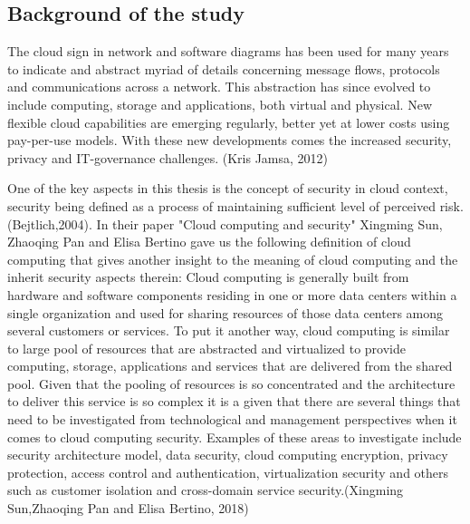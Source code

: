 \documentclass{article}
\begin{document}
\subsection{Background of the study}
The cloud sign in network and software diagrams has been used for many years to indicate and abstract myriad of details concerning message flows, protocols and communications across a network. This abstraction has since evolved to include computing, storage and applications, both virtual and physical. New flexible cloud capabilities are emerging regularly, better yet at lower costs using pay-per-use models. With these new developments comes the increased security, privacy and IT-governance challenges. (Kris Jamsa, 2012)
\par
One of the key aspects in this thesis is the concept of security in cloud context, security being defined as a process of maintaining sufficient level of perceived risk.(Bejtlich,2004).
In their paper "Cloud computing and security" Xingming Sun, Zhaoqing Pan and Elisa Bertino gave us the following definition of cloud computing that gives another insight to the meaning of cloud computing and the inherit security aspects therein: Cloud computing is generally built from hardware and software components residing in one or more data centers within a single organization and used for sharing resources of those data centers among several customers or services. To put it another way, cloud computing is similar to large pool of resources that are abstracted and virtualized to provide computing, storage, applications and services that are delivered from the shared pool. Given that the pooling of resources is so concentrated and the architecture to deliver this service is so complex it is a given that there are several things that need to be investigated from technological and management perspectives when it comes to cloud computing security. Examples of these areas to investigate include security architecture model, data security, cloud computing encryption, privacy protection, access control and authentication, virtualization security and others such as customer isolation and cross-domain service security.(Xingming Sun,Zhaoqing Pan and Elisa Bertino, 2018)
\par 
\end{document}
